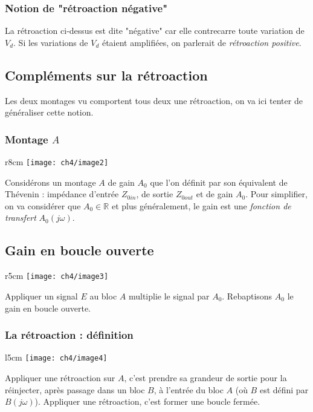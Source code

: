 		\subsubsection{Notion de "rétroaction négative"}
		La rétroaction ci-dessus est dite "négative" car elle contrecarre 
		toute variation de $V_d$. Si les variations de $V_d$ étaient 
		amplifiées, on parlerait de \textit{rétroaction positive}.



	\subsection{Compléments sur la rétroaction}
	Les deux montages vu comportent tous deux une rétroaction, on va ici 
	tenter de généraliser cette notion.
		
		\subsubsection{Montage $A$}
		\begin{wrapfigure}[5]{r}{8cm}
		\vspace{-8mm}
		\texttt{[image: ch4/image2]}
		\end{wrapfigure}
		Considérons un montage $A$ de gain $A_0$ que l'on définit par 
		son équivalent de Thévenin : impédance d'entrée $Z_{0in}$, de 
		sortie $Z_{0out}$ et de gain $A_0$. Pour simplifier, on va 
		considérer que $A_0 \in \mathbb{R}$ et plus généralement, le 
		gain est une \textit{fonction de transfert} $A_0(j\omega)$.
		
		\newpage
		\subsection{Gain en boucle ouverte}
		\begin{wrapfigure}[3]{r}{5cm}
		\vspace{-7mm}
		\texttt{[image: ch4/image3]}
		\end{wrapfigure}
		Appliquer un signal $E$ au bloc $A$ multiplie le signal par 
		$A_0$. Rebaptisons $A_0$ le gain en boucle ouverte.
		
		\subsubsection{La rétroaction : définition}
		\begin{wrapfigure}[4]{l}{5cm}
		\vspace{-7mm}
		\texttt{[image: ch4/image4]}
		\end{wrapfigure}
		Appliquer une rétroaction sur $A$, c'est prendre sa grandeur 
		de sortie pour la réinjecter, après passage dans un bloc $B$, 
		à l'entrée du bloc $A$ (où $B$ est défini par $B(j\omega)$). 
		Appliquer une rétroaction, c'est former une boucle fermée.\\
		
